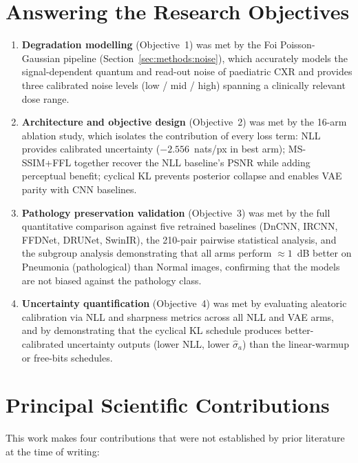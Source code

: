 \documentclass[12pt, a4paper, twoside, openright]{book}
\begin{document}
\section{Answering the Research Objectives}
\label{sec:conc:objectives}

\begin{enumerate}
  \item \textbf{Degradation modelling} (Objective~1) was met by the Foi Poisson-Gaussian pipeline (Section~\ref{sec:methods:noise}), which accurately models the signal-dependent quantum and read-out noise of paediatric CXR and provides three calibrated noise levels (low / mid / high) spanning a clinically relevant dose range.

  \item \textbf{Architecture and objective design} (Objective~2) was met by the 16-arm ablation study, which isolates the contribution of every loss term: NLL provides calibrated uncertainty ($-2.556$~nats/px in best arm); MS-SSIM+FFL together recover the NLL baseline's PSNR while adding perceptual benefit; cyclical KL prevents posterior collapse and enables VAE parity with CNN baselines.

  \item \textbf{Pathology preservation validation} (Objective~3) was met by the full quantitative comparison against five retrained baselines (DnCNN, IRCNN, FFDNet, DRUNet, SwinIR), the 210-pair pairwise statistical analysis, and the subgroup analysis demonstrating that all arms perform $\approx 1$~dB better on Pneumonia (pathological) than Normal images, confirming that the models are not biased against the pathology class.
  

  \item \textbf{Uncertainty quantification} (Objective~4) was met by evaluating aleatoric calibration via NLL and sharpness metrics across all NLL and VAE arms, and by demonstrating that the cyclical KL schedule produces better-calibrated uncertainty outputs (lower NLL, lower $\hat{\sigma}_a$) than the linear-warmup or free-bits schedules.
\end{enumerate}

\section{Principal Scientific Contributions}
\label{sec:conc:sci}

This work makes four contributions that were not established by prior literature at the time of writing:
\end{document}
